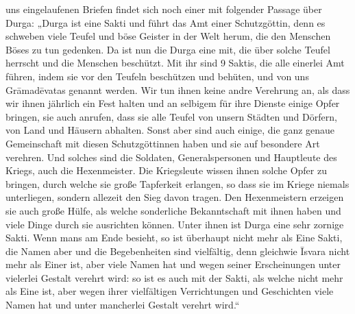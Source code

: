 \documentclass{article}
\begin{document}
uns eingelaufenen Briefen findet sich noch einer mit folgender Passage über Durga: „Durga ist eine Sakti und führt das Amt einer Schutzgöttin, denn es schweben viele Teufel und böse Geister in der Welt herum, die den Menschen Böses zu tun gedenken. Da ist nun die Durga eine mit, die über solche Teufel herrscht und die Menschen beschützt. Mit ihr sind 9 Saktis, die alle einerlei Amt führen, indem sie vor den Teufeln beschützen und behüten, und von uns Gr\={a}mad\={e}vatas genannt werden. Wir tun ihnen keine andre Verehrung an, als dass wir ihnen jährlich ein Fest halten und an selbigem für ihre Dienste einige Opfer bringen, sie auch anrufen, dass sie alle Teufel von unsern Städten und Dörfern, von Land und Häusern abhalten. Sonst aber sind auch einige, die ganz genaue Gemeinschaft mit diesen Schutzgöttinnen haben und sie auf besondere Art verehren. Und solches sind die Soldaten, Generalspersonen und Hauptleute des Kriegs, auch die Hexenmeister. Die Kriegsleute wissen ihnen solche Opfer zu bringen, durch welche sie große Tapferkeit erlangen, so dass sie im Kriege niemals unterliegen, sondern allezeit den Sieg davon tragen. Den Hexenmeistern erzeigen sie auch große Hülfe, als welche sonderliche Bekanntschaft mit ihnen haben und viele Dinge durch sie ausrichten können. Unter ihnen ist Durga eine sehr zornige Sakti. Wenn mans am Ende besieht, so ist überhaupt nicht mehr als Eine Sakti, die Namen aber und die Begebenheiten sind vielfältig, denn gleichwie \={I}svara nicht mehr als Einer ist, aber viele Namen hat und wegen seiner Erscheinungen unter vielerlei Gestalt verehrt wird: so ist es auch mit der Sakti, als welche nicht mehr als Eine ist, aber wegen ihrer vielfältigen Verrichtungen und Geschichten viele Namen hat und unter mancherlei Gestalt verehrt wird.“

\begin{center}
\end{center}
\end{document}
